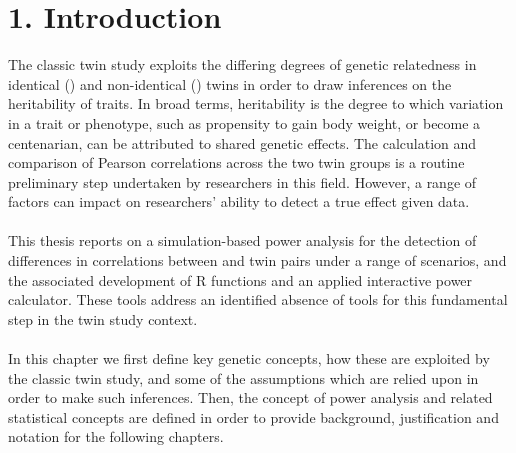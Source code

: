 \chapter*{1. Introduction}
\setcounter{chapter}{1}

			

\large



The classic twin study exploits the differing degrees of genetic relatedness in identical (\mz) and non-identical (\dz) twins in order to draw inferences on the heritability of traits.  In broad terms, heritability is the degree to which variation in a trait or phenotype, such as propensity to gain body weight, or become a centenarian, can be attributed to shared genetic effects.  The calculation and comparison of Pearson correlations across the two twin groups is a routine preliminary step undertaken by researchers in this field.  However, a range of factors can impact on researchers' ability to detect a true effect given data.  
\\
\\
This thesis reports on a simulation-based power analysis for the detection of differences in correlations between \mz and \dz twin pairs under a range of scenarios, and the associated development of R functions and an applied interactive power calculator.  These tools address an identified absence of tools for this fundamental step in the twin study context.
\\
\\
In this chapter we first define key genetic concepts, how these are exploited by the classic twin study, and some of the assumptions which are relied upon in order to make such inferences.  Then, the concept of power analysis and related statistical concepts are defined in order to provide background, justification and notation for the following chapters. 
 
